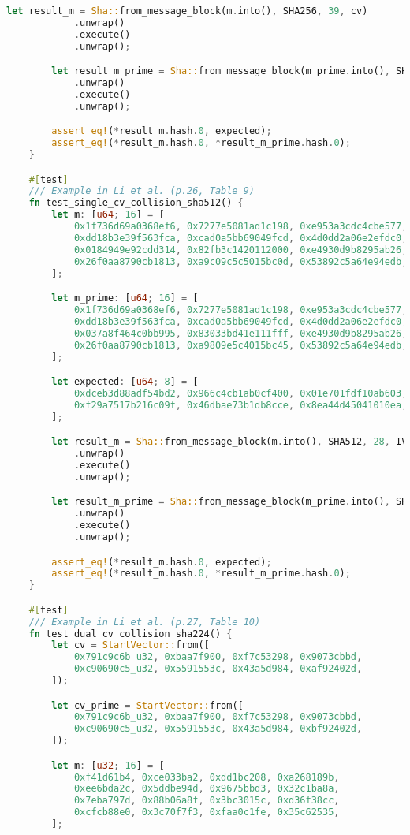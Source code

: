 \begin{lstlisting}[language=rust, caption={sha/sha.rs}]
		let result_m = Sha::from_message_block(m.into(), SHA256, 39, cv)
			.unwrap()
			.execute()
			.unwrap();

		let result_m_prime = Sha::from_message_block(m_prime.into(), SHA256, 39, cv)
			.unwrap()
			.execute()
			.unwrap();

		assert_eq!(*result_m.hash.0, expected);
		assert_eq!(*result_m.hash.0, *result_m_prime.hash.0);
	}

	#[test]
	/// Example in Li et al. (p.26, Table 9)
	fn test_single_cv_collision_sha512() {
		let m: [u64; 16] = [
			0x1f736d69a0368ef6, 0x7277e5081ad1c198, 0xe953a3cdc4cbe577, 0xbd05f6a203b2f75f,
			0xdd18b3e39f563fca, 0xcad0a5bb69049fcd, 0x4d0dd2a06e2efdc0, 0x86db19c26fc2e1cf,
			0x0184949e92cdd314, 0x82fb3c1420112000, 0xe4930d9b8295ab26, 0x5500d3a2f30a3402,
			0x26f0aa8790cb1813, 0xa9c09c5c5015bc0d, 0x53892c5a64e94edb, 0x8e60d500013a1932,
		];

		let m_prime: [u64; 16] = [
			0x1f736d69a0368ef6, 0x7277e5081ad1c198, 0xe953a3cdc4cbe577, 0xbd05f6a203b2f75f,
			0xdd18b3e39f563fca, 0xcad0a5bb69049fcd, 0x4d0dd2a06e2efdc0, 0x86db19c26fc2e1cf,
			0x037a8f464c0bb995, 0x83033bd41e111fff, 0xe4930d9b8295ab26, 0x5500d3a2f30a3402,
			0x26f0aa8790cb1813, 0xa9809e5c4015bc45, 0x53892c5a64e94edb, 0x8e60d500013a1932,
		];

		let expected: [u64; 8] = [
			0xdceb3d88adf54bd2, 0x966c4cb1ab0cf400, 0x01e701fdf10ab603, 0x796d6e5028a5e89a,
			0xf29a7517b216c09f, 0x46dbae73b1db8cce, 0x8ea44d45041010ea, 0x26a7a6b902f2632f,
		];

		let result_m = Sha::from_message_block(m.into(), SHA512, 28, IV)
			.unwrap()
			.execute()
			.unwrap();

		let result_m_prime = Sha::from_message_block(m_prime.into(), SHA512, 28, IV)
			.unwrap()
			.execute()
			.unwrap();

		assert_eq!(*result_m.hash.0, expected);
		assert_eq!(*result_m.hash.0, *result_m_prime.hash.0);
	}

	#[test]
	/// Example in Li et al. (p.27, Table 10)
	fn test_dual_cv_collision_sha224() {
		let cv = StartVector::from([
			0x791c9c6b_u32, 0xbaa7f900, 0xf7c53298, 0x9073cbbd,
			0xc90690c5_u32, 0x5591553c, 0x43a5d984, 0xaf92402d,
		]);

		let cv_prime = StartVector::from([
			0x791c9c6b_u32, 0xbaa7f900, 0xf7c53298, 0x9073cbbd,
			0xc90690c5_u32, 0x5591553c, 0x43a5d984, 0xbf92402d,
		]);

		let m: [u32; 16] = [
			0xf41d61b4, 0xce033ba2, 0xdd1bc208, 0xa268189b,
			0xee6bda2c, 0x5ddbe94d, 0x9675bbd3, 0x32c1ba8a,
			0x7eba797d, 0x88b06a8f, 0x3bc3015c, 0xd36f38cc,
			0xcfcb88e0, 0x3c70f7f3, 0xfaa0c1fe, 0x35c62535,
		];


\end{lstlisting}
